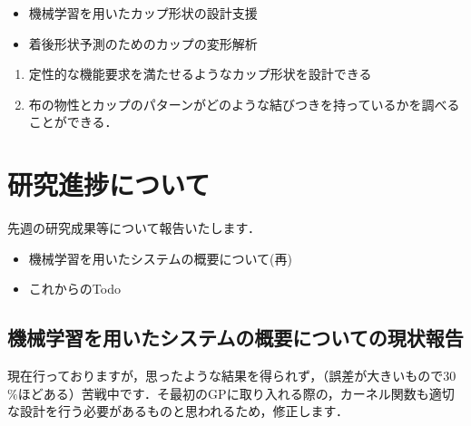 \documentclass[11pt]{jsarticle}
\begin{document}
	\articleSPRabst
		\begin{itemize}
			\item 機械学習を用いたカップ形状の設計支援
			\item 着後形状予測のためのカップの変形解析
		\end{itemize}
		
		
	\articleSPRobj
		\begin{enumerate}
			\item 定性的な機能要求を満たせるようなカップ形状を設計できる
			\item 布の物性とカップのパターンがどのような結びつきを持っているかを調べることができる．
		\end{enumerate}
	\articleSPRitemsone
		
		\tableofcontents
		
		
	\articleSPRitemstwo
	\renewcommand{\labelitemi}{$\blacktriangledown$}
	\section{研究進捗について}
		先週の研究成果等について報告いたします．
		\begin{itemize}
			\item 機械学習を用いたシステムの概要について(再)
			\item これからのTodo
		\end{itemize}
		\subsection{機械学習を用いたシステムの概要についての現状報告}
		現在行っておりますが，思ったような結果を得られず，（誤差が大きいもので30$\%$ほどある）苦戦中です．そ最初のGPに取り入れる際の，カーネル関数も適切な設計を行う必要があるものと思われるため，修正します．
\end{document}
